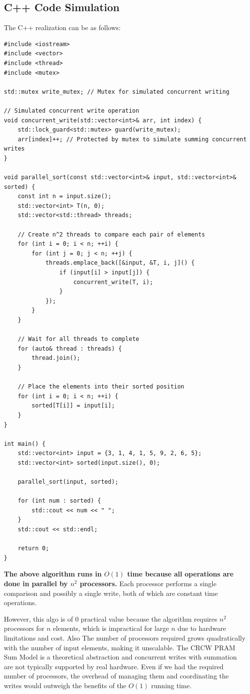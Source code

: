 \documentclass{article}
\begin{document}
\subsection*{C++ Code Simulation}
The C++ realization can be as follows:

\begin{lstlisting}
#include <iostream>
#include <vector>
#include <thread>
#include <mutex>

std::mutex write_mutex; // Mutex for simulated concurrent writing

// Simulated concurrent write operation
void concurrent_write(std::vector<int>& arr, int index) {
    std::lock_guard<std::mutex> guard(write_mutex);
    arr[index]++; // Protected by mutex to simulate summing concurrent writes
}

void parallel_sort(const std::vector<int>& input, std::vector<int>& sorted) {
    const int n = input.size();
    std::vector<int> T(n, 0);
    std::vector<std::thread> threads;

    // Create n^2 threads to compare each pair of elements
    for (int i = 0; i < n; ++i) {
        for (int j = 0; j < n; ++j) {
            threads.emplace_back([&input, &T, i, j]() {
                if (input[i] > input[j]) {
                    concurrent_write(T, i);
                }
            });
        }
    }

    // Wait for all threads to complete
    for (auto& thread : threads) {
        thread.join();
    }

    // Place the elements into their sorted position
    for (int i = 0; i < n; ++i) {
        sorted[T[i]] = input[i];
    }
}

int main() {
    std::vector<int> input = {3, 1, 4, 1, 5, 9, 2, 6, 5};
    std::vector<int> sorted(input.size(), 0);

    parallel_sort(input, sorted);

    for (int num : sorted) {
        std::cout << num << " ";
    }
    std::cout << std::endl;

    return 0;
}
\end{lstlisting}

\textbf{The above algorithm runs in \( O(1) \) time because all operations are done in parallel by \( n^2 \) processors.} Each processor performs a single comparison and possibly a single write, both of which are constant time operations.

However, this algo is of 0 practical value because the algorithm requires \( n^2 \) processors for \( n \) elements, which is impractical for large \( n \) due to hardware limitations and cost. Also The number of processors required grows quadratically with the number of input elements, making it unscalable. The CRCW PRAM Sum Model is a theoretical abstraction and concurrent writes with summation are not typically supported by real hardware. Even if we had the required number of processors, the overhead of managing them and coordinating the writes would outweigh the benefits of the \( O(1) \) running time.
\end{document}
